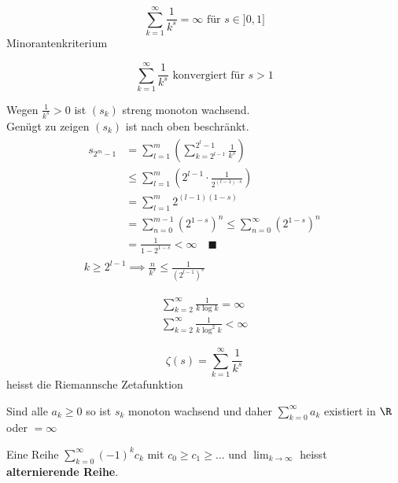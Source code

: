 \begin{bsp*}
	\[ \sum_{k=1}^\infty \frac{1}{k^s} = \infty \text{ für } s \in ]0,1] \]
	Minorantenkriterium
\end{bsp*}
\begin{bsp*}
	\[ \sum_{k=1}^\infty \frac{1}{k^s} \text{ konvergiert für } s > 1 \]
	\begin{bew}
		Wegen $\frac{1}{k^s} > 0$ ist $(s_k)$ streng monoton wachsend. \\
		Genügt zu zeigen $(s_k)$ ist nach oben beschränkt. \\
		\begin{gather*}
			\begin{split}
				s_{2^m - 1}	&= \sum_{l=1}^m \left( \sum_{k=2^{l-1}}^{2^l - 1} \frac{1}{k^s} \right) \\
							&\leq \sum_{l=1}^m \left( 2^{l-1} \cdot \frac{1}{2^{(l-1) \cdot s}} \right) \\
							&= \sum_{l=1}^m 2^{(l-1)(1-s)} \\
							&= \sum_{n=0}^{m-1} \left( 2^{1-s} \right)^n \leq \sum_{n=0}^\infty \left( 2^{1-s} \right)^n \\
							&= \frac{1}{1 - 2^{1-s}} < \infty \quad \blacksquare
			\end{split}\\
			k \geq 2^{l-1} \implies \frac{n}{k^s} \leq \frac{1}{(2^{l-1})^s}
		\end{gather*}
	\end{bew}
\end{bsp*}
\begin{bsp*}
	\begin{gather*}
		\sum_{k=2}^\infty \frac{1}{k \log k} = \infty \\
		\sum_{k=2}^\infty \frac{1}{k \log^2 k} < \infty
	\end{gather*}
\end{bsp*}
\begin{bem}
	\[ \zeta(s) = \sum_{k=1}^\infty \frac{1}{k^s}\]
	heisst die Riemannsche Zetafunktion
\end{bem}
\begin{bem}
	Sind alle $a_k \geq 0$ so ist $s_k$ monoton wachsend und daher $\sum_{k=0}^\infty a_k$ existiert in $\R$ oder $= \infty$
\end{bem}
\begin{def*}[note = alternierende Reihe , index = Reihe!alternierend]
	Eine Reihe $\sum_{k=0}^\infty (-1)^k c_k$ mit $c_0 \geq c_1 \geq \dots$ und $\lim_{k \rightarrow \infty}$ heisst \textbf{alternierende Reihe}.
\end{def*}
